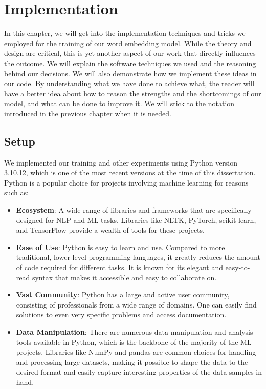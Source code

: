 
\chapter{Implementation}
\label{chp:implementation}

In this chapter, we will get into the implementation techniques and tricks we employed for the training of our word embedding model. While the theory and design are critical, this is yet another aspect of our work that directly influences the outcome. We will explain the software techniques we used and the reasoning behind our decisions. We will also demonstrate how we implement these ideas in our code. By understanding what we have done to achieve what, the reader will have a better idea about how to reason the strengths and the shortcomings of our model, and what can be done to improve it. We will stick to the notation introduced in the previous chapter when it is needed.

\section{Setup}

We implemented our training and other experiments using Python version 3.10.12, which is one of the most recent versions at the time of this dissertation. Python is a popular choice for projects involving machine learning for reasons such as:
\begin{itemize}
    \item \textbf{Ecosystem}: A wide range of libraries and frameworks that are specifically designed for \ac{NLP} and \ac{ML} tasks. Libraries like \ac{NLTK}, PyTorch, scikit-learn, and TensorFlow provide a wealth of tools for these projects.
    \item \textbf{Ease of Use}: Python is easy to learn and use. Compared to more traditional, lower-level programming languages, it greatly reduces the amount of code required for different tasks. It is known for its elegant and easy-to-read syntax that makes it accessible and easy to collaborate on.
    \item \textbf{Vast Community}: Python has a large and active user community, consisting of professionals from a wide range of domains. One can easily find solutions to even very specific problems and access documentation.
    \item \textbf{Data Manipulation}: There are numerous data manipulation and analysis tools available in Python, which is the backbone of the majority of the \ac{ML} projects. Libraries like NumPy and pandas are common choices for handling and processing large datasets, making it possible to shape the data to the desired format and easily capture interesting properties of the data samples in hand.
\end{itemize}

